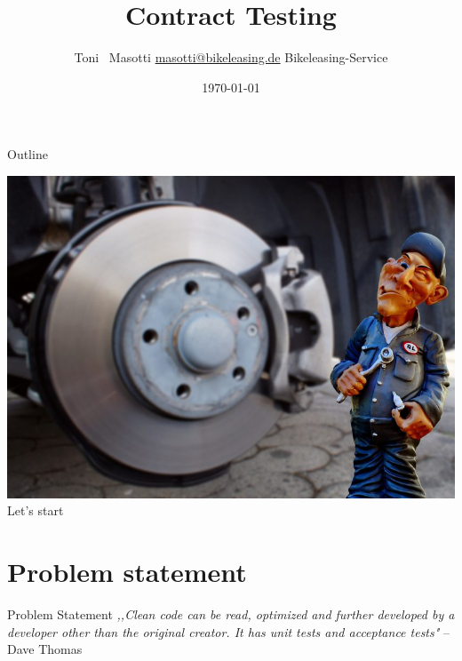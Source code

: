 


\title[Contract Testing]{Contract Testing }
\author[Toni Masotti]{\texorpdfstring{Toni ~Masotti  \newline \url{masotti@bikeleasing.de} \newline Bikeleasing-Service}{Toni Masotti}}
\date{\today}




\begin{frame}
		\maketitle
\end{frame}

\begin{frame}{Outline}
    \tableofcontents[hideallsubsections]
\end{frame}


\AtBeginSection[ ]
{
\frame{\tableofcontents[currentsection]}
}

\begin{frame}
\centering\includegraphics[width=.8\textwidth]{./assets/titelbild.jpg} 
\newline
\huge{Let's start}
\end{frame}


\section{Problem statement}

\begin{frame}{Problem Statement}
				\small{\textit{,,Clean code can be read, optimized and further developed by a developer other than the original creator. It has unit tests and acceptance tests"}} -- Dave Thomas

\end{frame}


